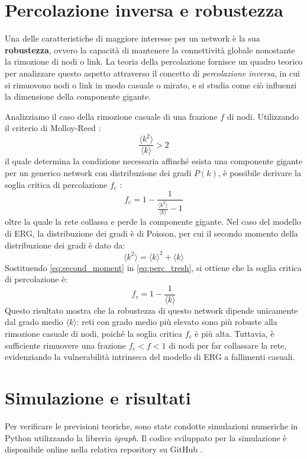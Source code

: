 \documentclass[12pt,italian]{article}
\begin{document}
\section{Percolazione inversa e robustezza}
Una delle caratteristiche di maggiore interesse per un network è la sua \textbf{robustezza}, ovvero la capacità di mantenere la connettività globale nonostante la rimozione di nodi o link. La teoria della percolazione fornisce un quadro teorico per analizzare questo aspetto attraverso il concetto di \emph{percolazione inversa}, in cui si rimuovono nodi o link in modo casuale o mirato, e si studia come ciò influenzi la dimensione della componente gigante.

Analizziamo il caso della rimozione casuale di una frazione $f$ di nodi. Utilizzando il criterio di Molloy-Reed \cite{barabasi2016network}:
\begin{equation}
    \frac{\langle k^2 \rangle}{\langle k \rangle} > 2
\end{equation}
il quale determina la condizione necessaria affinché esista una componente gigante per un generico network con distribuzione dei gradi $P(k)$, è possibile derivare la soglia critica di percolazione $f_c$ \cite{barabasi2016network}:
\begin{equation} \label{eq:perc_tresh}
    f_c = 1 - \frac{1}{\frac{\langle k^2 \rangle}{\langle k \rangle} - 1}
\end{equation}
oltre la quale la rete collassa e perde la componente gigante. Nel caso del modello di ERG, la distribuzione dei gradi è di Poisson, per cui il secondo momento della distribuzione dei gradi è dato da:
\begin{equation} \label{eq:second_moment}
    \langle k^2 \rangle = \langle k \rangle^2 + \langle k \rangle
\end{equation}
Sostituendo \eqref{eq:second_moment} in  \eqref{eq:perc_tresh}, si ottiene che la soglia critica di percolazione è:
\begin{equation}
    f_c = 1 - \frac{1}{\langle k \rangle}
\end{equation}
Questo risultato mostra che la robustezza di questo network dipende unicamente dal grado medio $\langle k \rangle$: reti con grado medio più elevato sono più robuste alla rimozione casuale di nodi, poiché la soglia critica $f_c$ è più alta. Tuttavia, è sufficiente rimuovere una frazione $f_c < f < 1$ di nodi per far collassare la rete, evidenziando la vulnerabilità intrinseca del modello di ERG a fallimenti casuali.

\section{Simulazione e risultati}
Per verificare le previsioni teoriche, sono state condotte simulazioni numeriche in Python utilizzando la libreria \emph{igraph}. Il codice sviluppato per la simulazione è disponibile online nella relativa repository su GitHub \cite{codice}.
\end{document}
